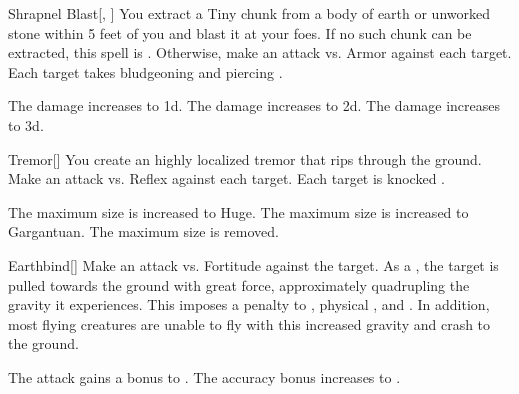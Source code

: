 \lowercase{\hypertarget{spell:Shrapnel Blast}{}}\label{spell:Shrapnel Blast}
\begin{freeability}[Rank 1]{\hypertarget{spell:Shrapnel Blast}{Shrapnel Blast}}[, ]
You extract a Tiny chunk from a body of earth or unworked stone within 5 feet of you and blast it at your foes.
If no such chunk can be extracted, this spell is .
Otherwise, make an attack vs. Armor against each target.
\hit Each target takes bludgeoning and piercing .

\rankline
{} The damage increases to  \plus1d.
 The damage increases to  \plus2d.
 The damage increases to  \plus3d.
\end{freeability}
\vspace{0.25em}



\lowercase{\hypertarget{spell:Tremor}{}}\label{spell:Tremor}
\begin{freeability}[Rank 1]{\hypertarget{spell:Tremor}{Tremor}}[]
You create an highly localized tremor that rips through the ground.
Make an attack vs. Reflex against each target.
\hit Each target is knocked .

\rankline
{} The maximum size is increased to Huge.
 The maximum size is increased to Gargantuan.
 The maximum size is removed.
\end{freeability}
\vspace{0.25em}



\lowercase{\hypertarget{spell:Earthbind}{}}\label{spell:Earthbind}
\begin{freeability}[Rank 3]{\hypertarget{spell:Earthbind}{Earthbind}}[]
Make an attack vs. Fortitude against the target.
\hit As a , the target is pulled towards the ground with great force, approximately quadrupling the gravity it experiences.
This imposes a  penalty to , physical , and .
In addition, most flying creatures are unable to fly with this increased gravity and crash to the ground.

\rankline
{} The attack gains a  bonus to .
 The accuracy bonus increases to .
\end{freeability}
\vspace{0.25em}



